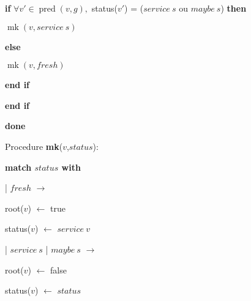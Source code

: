 \documentclass{article}
\newcommand{\hs}{\hspace{4mm}}
\newcommand{\pred}[2]{\ensuremath{\operatorname{pred}(#1,#2)}}
\newcommand{\mk}[2]{\ensuremath{\operatorname{mk}(#1,#2)}}
\begin{document}
  \hs \hs \textbf{if} $\forall v' \in \pred{v}{g},$ 
  status($v'$) = ($service~s$ ou $maybe~s$) \textbf{then}

  \hs \hs \hs \mk{v}{service~s}

  \hs \hs \textbf{else} 

  \hs \hs \hs \mk{v}{fresh}

  \hs \hs \textbf{end if}

  \hs \textbf{end if}

\textbf{done}

\bigskip

Procedure \textbf{mk}($v$,$status$):
\smallskip

\textbf{match $status$ with}

| $fresh$ $\rightarrow$ 

\hs root($v$) $\leftarrow$ true

\hs status($v$) $\leftarrow$ $service~v$

| $service~s$ | $maybe~s$ $\rightarrow$ 

\hs root($v$) $\leftarrow$ false

\hs status($v$) $\leftarrow$ $status$
\end{document}
